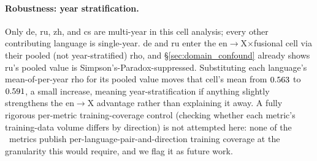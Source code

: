 \documentclass[11pt]{article}
\begin{document}
\paragraph{Robustness: year stratification.} Only de, ru, zh, and cs are multi-year in this cell analysis; every other contributing language is single-year. de and ru enter the en$\to$X$\times$fusional cell via their pooled (not year-stratified) rho, and \S\ref{sec:domain_confound} already shows ru's pooled value is Simpson's-Paradox-suppressed. Substituting each language's mean-of-per-year rho for its pooled value moves that cell's mean from $0.563$ to $0.591$, a small increase, meaning year-stratification if anything slightly strengthens the en$\to$X advantage rather than explaining it away. A fully rigorous per-metric training-coverage control (checking whether each metric's training-data volume differs by direction) is not attempted here: none of the \NumMetrics\ metrics publish per-language-pair-and-direction training coverage at the granularity this would require, and we flag it as future work.
\end{document}
